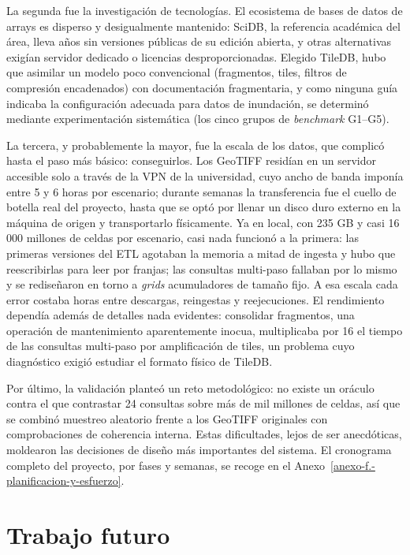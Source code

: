 La segunda fue la investigación de tecnologías. El ecosistema de bases de datos de arrays es disperso y desigualmente mantenido: SciDB, la referencia académica del área, lleva años sin versiones públicas de su edición abierta, y otras alternativas exigían servidor dedicado o licencias desproporcionadas. Elegido TileDB, hubo que asimilar un modelo poco convencional (fragmentos, tiles, filtros de compresión encadenados) con documentación fragmentaria, y como ninguna guía indicaba la configuración adecuada para datos de inundación, se determinó mediante experimentación sistemática (los cinco grupos de \textit{benchmark} G1--G5).

La tercera, y probablemente la mayor, fue la escala de los datos, que complicó hasta el paso más básico: conseguirlos. Los GeoTIFF residían en un servidor accesible solo a través de la VPN de la universidad, cuyo ancho de banda imponía entre 5 y 6 horas por escenario; durante semanas la transferencia fue el cuello de botella real del proyecto, hasta que se optó por llenar un disco duro externo en la máquina de origen y transportarlo físicamente. Ya en local, con 235 GB y casi 16\,000 millones de celdas por escenario, casi nada funcionó a la primera: las primeras versiones del ETL agotaban la memoria a mitad de ingesta y hubo que reescribirlas para leer por franjas; las consultas multi-paso fallaban por lo mismo y se rediseñaron en torno a \textit{grids} acumuladores de tamaño fijo. A esa escala cada error costaba horas entre descargas, reingestas y reejecuciones. El rendimiento dependía además de detalles nada evidentes: consolidar fragmentos, una operación de mantenimiento aparentemente inocua, multiplicaba por 16 el tiempo de las consultas multi-paso por amplificación de tiles, un problema cuyo diagnóstico exigió estudiar el formato físico de TileDB.

Por último, la validación planteó un reto metodológico: no existe un oráculo contra el que contrastar 24 consultas sobre más de mil millones de celdas, así que se combinó muestreo aleatorio frente a los GeoTIFF originales con comprobaciones de coherencia interna. Estas dificultades, lejos de ser anecdóticas, moldearon las decisiones de diseño más importantes del sistema. El cronograma completo del proyecto, por fases y semanas, se recoge en el Anexo~\ref{anexo-f.-planificacion-y-esfuerzo}.

\section{Trabajo futuro}\label{trabajo-futuro}

